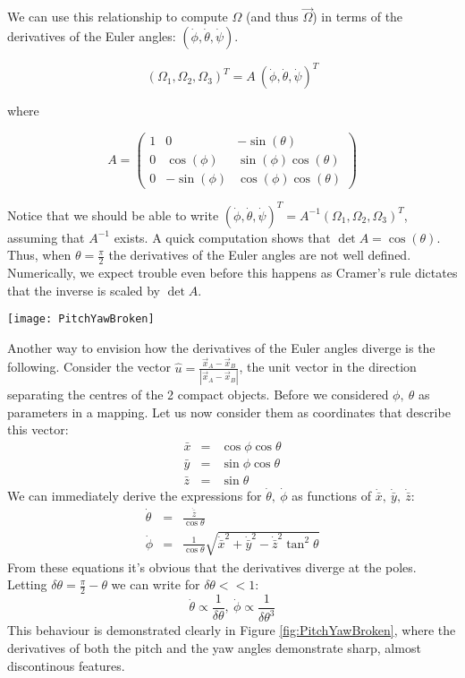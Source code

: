 \documentclass[aps, prd, amsmath, floats, floatfix, twocolumn,superscriptaddress, nofootinbib, showpacs]{revtex4-1}
\theoremstyle{plain}
\theoremstyle{definition}
\begin{document}
We can use this relationship to compute $\Omega$ (and thus $\vec{\Omega}$) in
terms of the derivatives of the Euler angles: 
$(\dot{\phi},\dot{\theta},\dot{\psi})$.

\[
(\Omega_1,\Omega_2,\Omega_3)^{T}=A\ (\dot{\phi},\dot{\theta},\dot{\psi})^{T}
\]

where 

\[A=\left(\begin{array}{ccc}
1 & 0 & -\sin(\theta) \\
0 & \cos(\phi) &\sin(\phi)\cos(\theta)\\
0 & -\sin(\phi) & \cos(\phi)\cos(\theta)
\end{array}\right)\]

Notice that we should be able to write $(\dot{\phi},\dot{\theta},
\dot{\psi})^{T} = A^{-1}(\Omega_1,\Omega_2,\Omega_3)^{T}$, assuming that 
$A^{-1}$ exists. A quick computation shows that $\det{A}=\cos(\theta)$. 
Thus, when $\theta=\frac{\pi}{2}$ the derivatives of the Euler angles are not
well defined. Numerically, we expect trouble even before this happens as 
Cramer's rule dictates that the inverse is scaled by $\det{A}$. \\

\begin{figure*}[!htbp]
  \texttt{[image: PitchYawBroken]}
  \caption{Typical behaviour of the Pitch and Yaw angles and their derivatives for a nearly polar orbit inclined at 85 degrees with respect to the $x-y$ plane }
  \label{fig:PitchYawBroken}
\end{figure*}


Another way to envision how the derivatives of the Euler angles diverge is the following. Consider the vector $\hat{u}=\frac{\vec{x}_A-\vec{x}_B}{|\vec{x}_A-\vec{x}_B|}$, the unit vector in the direction separating the centres of the 2 compact objects. Before we considered $\phi,\ \theta$ as parameters in a mapping. Let us now consider them as coordinates that describe this vector:
\begin{eqnarray*}
\bar{x}&=&\cos\phi\cos\theta\\
\bar{y}&=&\sin\phi\cos\theta\\
\bar{z}&=&\sin\theta
\end{eqnarray*}
We can immediately derive the expressions for $\dot{\theta},\ \dot{\phi}$ as functions of $\dot{\bar{x}}, \ \dot{\bar{y}},\ \dot{\bar{z}}$:
\begin{eqnarray}
\dot{\theta} &=& \frac{\dot{\bar{z}}}{\cos\theta}\\
\dot{\phi}   &=& \frac{1}{\cos\theta}\sqrt{\dot{\bar{x}}^{2}+\dot{\bar{y}}^2-\dot{\bar{z}}^2\tan^{2}\theta}
\end{eqnarray}
From these equations it's obvious that the derivatives diverge at the poles. Letting $\delta\theta = \frac{\pi}{2}-\theta$ we can write for $\delta\theta<<1$:
\[
\dot{\theta} \propto \frac{1}{\delta \theta},\ \dot{\phi} \propto \frac{1}{\delta \theta^{3}}  
\]
This behaviour is demonstrated clearly in Figure \ref{fig:PitchYawBroken}, where the derivatives of both the pitch and the yaw angles demonstrate sharp, almost discontinous features.
\end{document}

